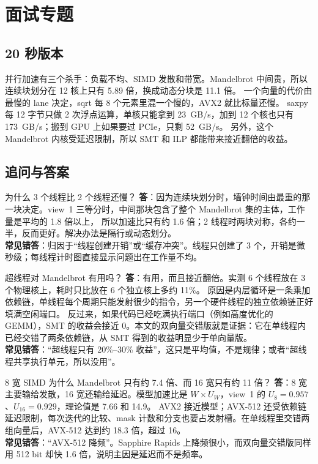 \documentclass[11pt,a4paper]{ctexart}
\begin{document}
\section{面试专题}
\label{sec:interview}

\subsection{20 秒版本}

并行加速有三个杀手：负载不均、SIMD 发散和带宽。Mandelbrot 中间贵，所以连续块划分在 12 核上只有 5.89 倍，换成动态分块是 11.1 倍。
一个向量的代价由最慢的 lane 决定，sqrt 每 8 个元素里混一个慢的，AVX2 就比标量还慢。
saxpy 每 12 字节只做 2 次浮点运算，单核只能拿到 23~GB/s，加到 12 个核也只有 173~GB/s；搬到 GPU 上如果要过 PCIe，只剩 52~GB/s。
另外，这个 Mandelbrot 内核受延迟限制，所以 SMT 和 ILP 都能带来接近翻倍的收益。

\subsection{追问与答案}

\begin{iqbox}{为什么 3 个线程比 2 个线程还慢？}
\textbf{答}：因为连续块划分时，墙钟时间由最重的那一块决定。view~1 三等分时，中间那块包含了整个 Mandelbrot 集的主体，工作量是平均的 1.8 倍以上，
所以加速比只有约 1.6 倍；2 线程时两块对称，各约一半，反而更好。解决办法是隔行或动态划分。\\
\textbf{常见错答}：归因于``线程创建开销''或``缓存冲突''。线程只创建了 3 个，开销是微秒级；每线程计时图直接显示问题出在工作量不均。
\end{iqbox}

\begin{iqbox}{超线程对 Mandelbrot 有用吗？}
\textbf{答}：有用，而且接近翻倍。实测 6 个线程放在 3 个物理核上，耗时只比放在 6 个独立核上多约 11\%。
原因是内层循环是一条乘加依赖链，单线程每个周期只能发射很少的指令，另一个硬件线程的独立依赖链正好填满空闲端口。
反过来，如果代码已经吃满执行端口（例如高度优化的 GEMM），SMT 的收益会接近 0。本文的双向量交错版就是证据：它在单线程内已经交错了两条依赖链，从 SMT 得到的收益明显少于单向量版。\\
\textbf{常见错答}：``超线程只有 20\%--30\% 收益''，这只是平均值，不是规律；或者``超线程共享执行单元，所以没用''。
\end{iqbox}

\begin{iqbox}{8 宽 SIMD 为什么 Mandelbrot 只有约 7.4 倍、而 16 宽只有约 11 倍？}
\textbf{答}：8 宽主要输给发散，16 宽还输给延迟。模型加速比是 $W\times U_W$，view~1 的 $U_8=0.957$、$U_{16}=0.929$，理论值是 7.66 和 14.9。
AVX2 接近模型；AVX-512 还受依赖链延迟限制，每次迭代的比较、mask 计数和分支也要占发射槽。在单线程里交错两组向量后，AVX-512 达到约 18.3 倍，超过 16。\\
\textbf{常见错答}：``AVX-512 降频''。Sapphire Rapids 上降频很小，而双向量交错版同样用 512 bit 却快 1.6 倍，说明主因是延迟而不是频率。
\end{iqbox}
\end{document}
